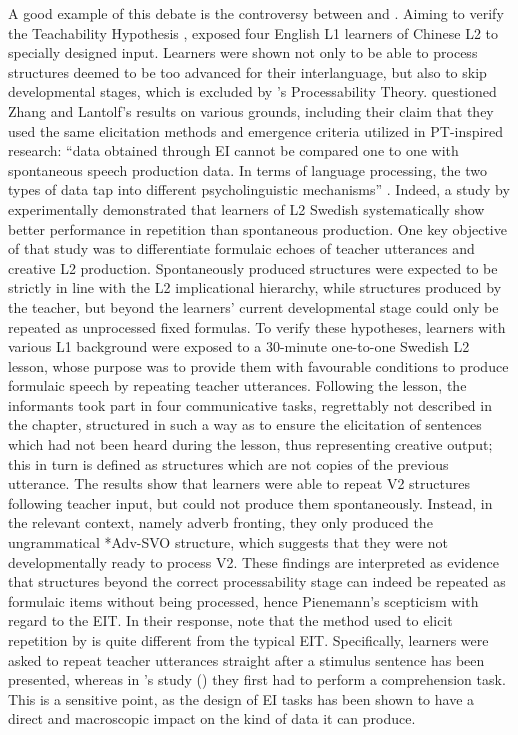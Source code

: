 A good example of this debate is the controversy between \citet{ZhangLantolf2015} and \citet{Pienemann2015}. Aiming to verify the Teachability Hypothesis \citep{Pienemann1984}, \citeauthor{ZhangLantolf2015} exposed four English L1 learners of Chinese L2 to specially designed input. Learners were shown not only to be able to process structures deemed to be too advanced for their interlanguage, but also to skip developmental stages, which is excluded by \citeauthor{Pienemann2015}’s Processability Theory. \citet{Pienemann2015} questioned Zhang and Lantolf's results on various grounds, including their claim that they used the same elicitation methods and emergence criteria utilized in PT-inspired research: “data obtained through EI cannot be compared one to one with spontaneous speech production data. In terms of language processing, the two types of data tap into different psycholinguistic mechanisms” \citep[139]{Pienemann2015}. Indeed, a study by \citet{PienemanEtAl2013} experimentally demonstrated that learners of L2 Swedish systematically show better performance in repetition than spontaneous production. One key objective of that study was to differentiate formulaic echoes of teacher utterances and creative L2 production. Spontaneously produced structures were expected to be strictly in line with the L2 implicational hierarchy, while structures produced by the teacher, but beyond the learners’ current developmental stage could only be repeated as unprocessed fixed formulas. To verify these hypotheses, learners with various L1 background were exposed to a 30-minute one-to-one Swedish L2 lesson, whose purpose was to provide them with favourable conditions to produce formulaic speech by repeating teacher utterances. Following the lesson, the informants took part in four communicative tasks, regrettably not described in the chapter, structured in such a way as to ensure the elicitation of sentences which had not been heard during the lesson, thus representing creative output; this in turn is defined as structures which are not copies of the previous utterance. The results show that learners were able to repeat V2 structures following teacher input, but could not produce them spontaneously. Instead, in the relevant context, namely adverb fronting, they only produced the ungrammatical *Adv-SVO structure, which suggests that they were not developmentally ready to process V2. These findings are interpreted as evidence that structures beyond the correct processability stage can indeed be repeated as formulaic items without being processed, hence Pienemann's scepticism with regard to the EIT. In their response, \citet{LantolfZhang2015} note that the method used to elicit repetition by \citet{PienemannEtAl2013} is quite different from the typical EIT. Specifically, learners were asked to repeat teacher utterances straight after a stimulus sentence has been presented, whereas in \citeauthor{LantolfZhang2015}'s study (\citeyear{LantolfZhang2015}) they first had to perform a comprehension task. This is a sensitive point, as the design of EI tasks has been shown to have a direct and macroscopic impact on the kind of data it can produce. 

